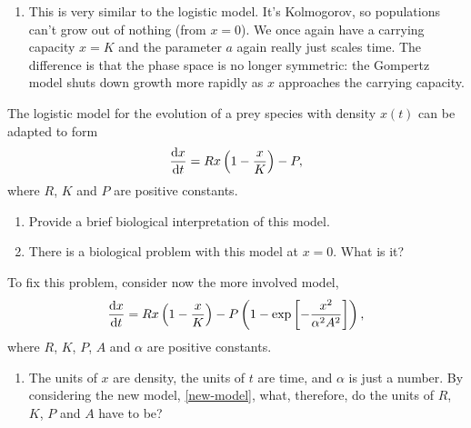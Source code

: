 \documentclass[a4paper,12pt]{article}
\begin{document}
\begin{enumerate}
{\begin{enumerate}
        \item This is very similar to the logistic model. It's Kolmogorov, so populations can't grow out of nothing (from $x=0$). We once again have a carrying capacity $x=K$ and the parameter $a$ again really just scales time. The difference is that the phase space is no longer symmetric: the Gompertz model shuts down growth more rapidly as $x$ approaches the carrying capacity.
      \end{enumerate}

    }

    { %
      The logistic model for the evolution of a prey species with density $x(t)$ can be adapted to form
      \begin{equation}
        \fd{x}{t} = Rx\left(1-\frac{x}{K}\right) - P,
        \label{adapted-log}
      \end{equation}
      where $R$, $K$ and $P$ are positive constants.
      \begin{enumerate}
        \item Provide a brief biological interpretation of this model.
        \item There is a biological problem with this model at $x=0$. What is it?
      \end{enumerate}
      To fix this problem, consider now the more involved model,
      \begin{equation}
        \fd{x}{t} = Rx\left(1-\frac{x}{K}\right) - P\left( 1 - \exp\left[-\frac{x^2}{\alpha^2 A^2}\right] \right),
        \label{new-model}
      \end{equation}
      where $R$, $K$, $P$, $A$ and $\alpha$ are positive constants.
      \begin{enumerate}[resume]
        \item The units of $x$ are density, the units of $t$ are time, and $\alpha$ is just a number. By considering the new model, \cref{new-model}, what, therefore, do the units of $R$, $K$, $P$ and $A$ have to be?


\end{enumerate}}
\end{enumerate}
\end{document}
